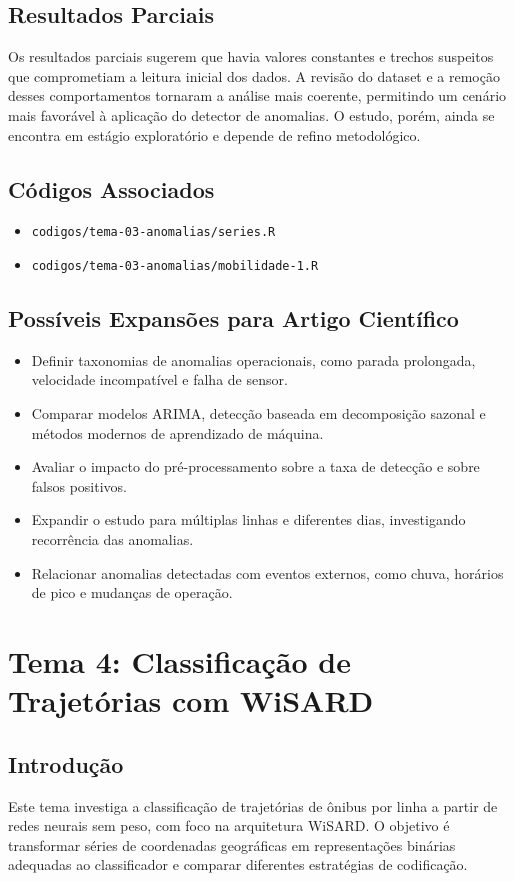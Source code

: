 \documentclass[runningheads]{llncs}
\begin{document}
\subsection{Resultados Parciais}
Os resultados parciais sugerem que havia valores constantes e trechos suspeitos que comprometiam a leitura inicial dos dados. A revisão do dataset e a remoção desses comportamentos tornaram a análise mais coerente, permitindo um cenário mais favorável à aplicação do detector de anomalias. O estudo, porém, ainda se encontra em estágio exploratório e depende de refino metodológico.

\subsection{Códigos Associados}
\begin{itemize}[leftmargin=*]
\item \texttt{codigos/tema-03-anomalias/series.R}
\item \texttt{codigos/tema-03-anomalias/mobilidade-1.R}
\end{itemize}

\subsection{Possíveis Expansões para Artigo Científico}
\begin{itemize}[leftmargin=*]
\item Definir taxonomias de anomalias operacionais, como parada prolongada, velocidade incompatível e falha de sensor.
\item Comparar modelos ARIMA, detecção baseada em decomposição sazonal e métodos modernos de aprendizado de máquina.
\item Avaliar o impacto do pré-processamento sobre a taxa de detecção e sobre falsos positivos.
\item Expandir o estudo para múltiplas linhas e diferentes dias, investigando recorrência das anomalias.
\item Relacionar anomalias detectadas com eventos externos, como chuva, horários de pico e mudanças de operação.
\end{itemize}

\section{Tema 4: Classificação de Trajetórias com WiSARD}

\subsection{Introdução}
Este tema investiga a classificação de trajetórias de ônibus por linha a partir de redes neurais sem peso, com foco na arquitetura WiSARD. O objetivo é transformar séries de coordenadas geográficas em representações binárias adequadas ao classificador e comparar diferentes estratégias de codificação.
\end{document}
